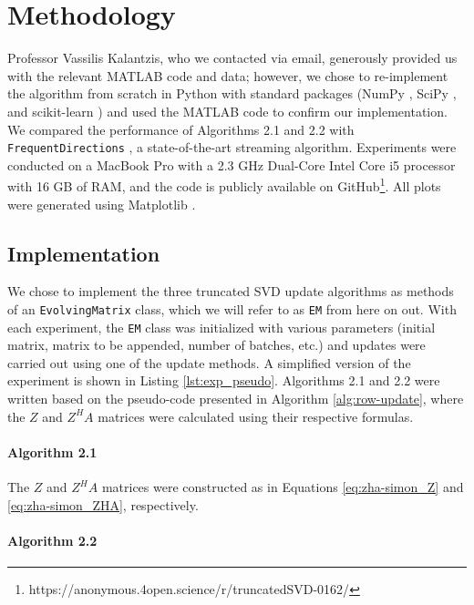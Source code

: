 \section{Methodology} \label{sec:methods}

Professor Vassilis Kalantzis, who we contacted via email, generously provided us with the relevant MATLAB code and data; however, we chose to re-implement the algorithm from scratch in Python with standard packages (NumPy \cite{numpy}, SciPy \cite{scipy}, and scikit-learn \cite{scikit-learn}) and used the MATLAB code to confirm our implementation. We compared the performance of Algorithms 2.1 and 2.2 with \verb|FrequentDirections| \cite{Ghashami2016}, a state-of-the-art streaming algorithm. Experiments were conducted on a MacBook Pro with a 2.3 GHz Dual-Core Intel Core i5 processor with 16 GB of RAM, and the code is publicly available on GitHub\footnote{https://anonymous.4open.science/r/truncatedSVD-0162/}. All plots were generated using Matplotlib \cite{matplotlib}.

\subsection{Implementation}

We chose to implement the three truncated SVD update algorithms as methods of an \verb|EvolvingMatrix| class, which we will refer to as \verb|EM| from here on out. With each experiment, the \verb|EM| class was initialized with various parameters (initial matrix, matrix to be appended, number of batches, etc.) and updates were carried out using one of the update methods. A simplified version of the experiment is shown in Listing \ref{lst:exp_pseudo}. Algorithms 2.1 and 2.2 were written based on the pseudo-code presented in Algorithm \ref{alg:row-update}, where the $Z$ and $Z^H A$ matrices were calculated using their respective formulas. 



\paragraph{Algorithm 2.1}

The $Z$ and $Z^H A$ matrices were constructed as in Equations \ref{eq:zha-simon_Z} and \ref{eq:zha-simon_ZHA}, respectively. 

\paragraph{Algorithm 2.2}

